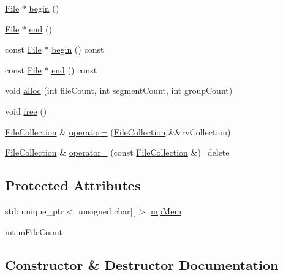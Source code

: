 \begin{DoxyCompactItemize}
\item 
\hyperlink{class_n_z_b_1_1_file}{File} $\ast$ \hyperlink{class_n_z_b_1_1_file_collection_a26b50aedb8d73b4fba8aef7792c9f699}{begin} ()
\item 
\hyperlink{class_n_z_b_1_1_file}{File} $\ast$ \hyperlink{class_n_z_b_1_1_file_collection_ad792a3e63dad005cb44f6aa89a836673}{end} ()
\item 
const \hyperlink{class_n_z_b_1_1_file}{File} $\ast$ \hyperlink{class_n_z_b_1_1_file_collection_a9f357afe639a9fd066539466b9ce5d47}{begin} () const
\item 
const \hyperlink{class_n_z_b_1_1_file}{File} $\ast$ \hyperlink{class_n_z_b_1_1_file_collection_a781f4a5fec907bc7e46e144a300dd174}{end} () const
\item 
void \hyperlink{class_n_z_b_1_1_file_collection_a4caeac68cec4f2bd02fe82255ba52d33}{alloc} (int file\+Count, int segment\+Count, int group\+Count)
\item 
void \hyperlink{class_n_z_b_1_1_file_collection_a8888183a256a7afbbbdde5b19f2fbf9f}{free} ()
\item 
\hyperlink{class_n_z_b_1_1_file_collection}{File\+Collection} \& \hyperlink{class_n_z_b_1_1_file_collection_a974ea8d9e7851511eddf7c6bbb82741f}{operator=} (\hyperlink{class_n_z_b_1_1_file_collection}{File\+Collection} \&\&rv\+Collection)
\item 
\hyperlink{class_n_z_b_1_1_file_collection}{File\+Collection} \& \hyperlink{class_n_z_b_1_1_file_collection_a9a39412f971ae08850615fd4eaca730a}{operator=} (const \hyperlink{class_n_z_b_1_1_file_collection}{File\+Collection} \&)=delete
\end{DoxyCompactItemize}
\subsection*{Protected Attributes}
\begin{DoxyCompactItemize}
\item 
std\+::unique\+\_\+ptr$<$ unsigned char\mbox{[}$\,$\mbox{]}$>$ \hyperlink{class_n_z_b_1_1_file_collection_aee454b60ab12185c5328e950d5b1d444}{mp\+Mem}
\item 
int \hyperlink{class_n_z_b_1_1_file_collection_a54a530b2c5e4e487d588eee98e403cbe}{m\+File\+Count}
\end{DoxyCompactItemize}


\subsection{Constructor \& Destructor Documentation}
\hypertarget{class_n_z_b_1_1_file_collection_a2ae200e24e6a4ee4d1be8e649f72aba9}{}\label{class_n_z_b_1_1_file_collection_a2ae200e24e6a4ee4d1be8e649f72aba9} 
